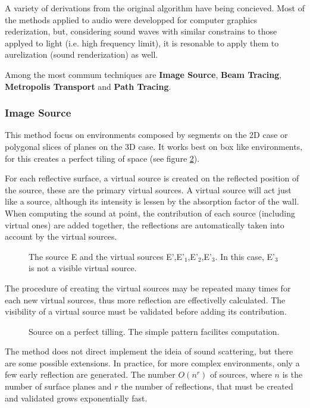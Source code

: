 A variety of derivations from the original algorithm have being concieved. Most
of the methods applied to audio were developped for computer graphics
rederization, but, considering sound waves with similar constrains to those
applyed to light (i.e. high frequency limit), it is resonable to apply them to
aurelization (sound renderization) as well.


Among the most commum techniques are \textbf{Image Source}, \textbf{Beam
Tracing}, \textbf{Metropolis Transport} and \textbf{Path Tracing}.

\subsubsection{Image Source}

This method focus on environments composed by segments on the 2D case or
polygonal slices of planes on the 3D case. It works best on box like
environments, for this creates a perfect tiling of
space\cite{funkhouser2003survey} (see figure \ref{fig:tillingsource}).

For each reflective surface, a virtual source is created on the reflected
position of the source, these are the primary virtual sources. A virtual source
will act just like a source, although its intensity is lessen by the absorption
factor of the wall. When computing the sound at point, the
contribution of each source (including virtual ones) are added together, the
reflections are automatically taken into account by the virtual sources.

\begin{figure}[h]
	\centering
	
	\caption{The source E and the virtual sources E',E'$_1$,E'$_2$,E'$_3$. In this
	case, E'$_3$ is not a visible virtual source.}
	\label{fig:imagesource}
\end{figure}


The procedure of creating the virtual sources may be repeated many times for
each new virtual sources, thus more reflection are effectivelly calculated. The
visibility of a virtual source must be validated before adding its contribution.

\begin{figure}[h]
	\centering
	
	\caption{Source on a perfect tilling. The simple pattern facilites
	computation.}
	\label{fig:tillingsource}
\end{figure}

The method does not direct implement the ideia of sound scattering, but there
are some possible extensions\cite{chandak2011fast}. In practice, for more
complex environments, only a few early reflection are generated. The number
$O(n^r)$ of sources, where $n$ is the number of surface planes and $r$ the
number of reflections, that must be created and validated grows exponentially
fast.

